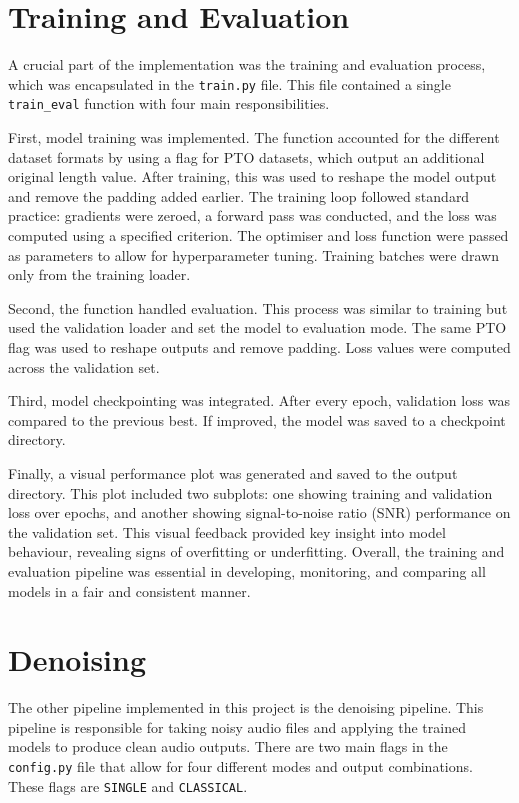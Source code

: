 \section{Training and Evaluation}
\label{sec:training_and_evaluation}

A crucial part of the implementation was the training and evaluation process, which was encapsulated in the \texttt{train.py} file. This file contained a single \texttt{train\_eval} function with four main responsibilities.

First, model training was implemented. The function accounted for the different dataset formats by using a flag for PTO datasets, which output an additional original length value. After training, this was used to reshape the model output and remove the padding added earlier. The training loop followed standard practice: gradients were zeroed, a forward pass was conducted, and the loss was computed using a specified criterion. The optimiser and loss function were passed as parameters to allow for hyperparameter tuning. Training batches were drawn only from the training loader.

Second, the function handled evaluation. This process was similar to training but used the validation loader and set the model to evaluation mode. The same PTO flag was used to reshape outputs and remove padding. Loss values were computed across the validation set.

Third, model checkpointing was integrated. After every epoch, validation loss was compared to the previous best. If improved, the model was saved to a checkpoint directory.

Finally, a visual performance plot was generated and saved to the output directory. This plot included two subplots: one showing training and validation loss over epochs, and another showing signal-to-noise ratio (SNR) performance on the validation set. This visual feedback provided key insight into model behaviour, revealing signs of overfitting or underfitting. Overall, the training and evaluation pipeline was essential in developing, monitoring, and comparing all models in a fair and consistent manner.


\section{Denoising}
\label{sec:denoising}

The other pipeline implemented in this project is the denoising pipeline. This pipeline is responsible for taking noisy audio files and applying the trained models to produce clean audio outputs. There are two main flags in the \texttt{config.py} file that allow for four different modes and output combinations. These flags are \texttt{SINGLE} and \texttt{CLASSICAL}.

